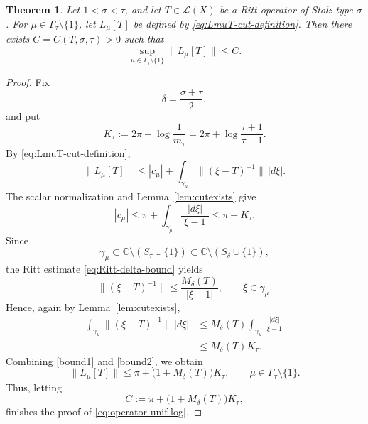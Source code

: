 \documentclass[11pt]{amsart}
\numberwithin{equation}{section}
\newtheorem{theorem}{Theorem}[section]
\theoremstyle{definition}
\theoremstyle{plain}
\def\L{L}
\renewcommand{\L}{\mathcal L}
\begin{document}
\begin{theorem}\label{thm:operator-log-bound}
Let \(1<\sigma<\tau\), and let \(T\in\L(X)\) be a Ritt operator
of Stolz type \(\sigma\).  For \(\mu\in\Gamma_\tau\setminus\{1\}\), let
\(L_\mu[T]\) be defined by \eqref{eq:LmuT-cut-definition}.  
Then there exists
\(C=C(T,\sigma,\tau)>0\) such that 
\begin{equation}\label{eq:operator-unif-log}
        \sup_{\mu\in\Gamma_\tau\setminus\{1\}}
        \|L_\mu[T]\|
        \le C.
\end{equation}
\end{theorem}
\begin{proof}
Fix
\[
        \delta=\frac{\sigma+\tau}{2},
\]
and put
\[
        K_\tau
        :=
        2\pi+\log\frac{1}{m_\tau}
        =
        2\pi+\log\frac{\tau+1}{\tau-1}.
\]
By \eqref{eq:LmuT-cut-definition},
\begin{equation}\label{bound1}
        \|L_\mu[T]\|
        \le
        |c_\mu|
        +
        \int_{\gamma_\mu}\|(\xi-T)^{-1}\|\,|d\xi|.
\end{equation}
The scalar normalization and Lemma~\ref{lem:cutexists} give
\[
        |c_\mu|
        \le
        \pi+
        \int_{\gamma_\mu}\frac{|d\xi|}{|\xi-1|}
        \le
        \pi+K_\tau.
\]
Since
\[
        \gamma_\mu
        \subset
        \mathbb C\setminus(S_\tau\cup\{1\})
        \subset
        \mathbb C\setminus(S_\delta\cup\{1\}),
\]
the Ritt estimate \eqref{eq:Ritt-delta-bound} yields
\[
        \|(\xi-T)^{-1}\|
        \le
        \frac{M_\delta(T)}{|\xi-1|},
        \qquad
        \xi\in\gamma_\mu.
\]
Hence, again by Lemma~\ref{lem:cutexists},
\begin{equation}\label{bound2}
\begin{aligned}
        \int_{\gamma_\mu}\|(\xi-T)^{-1}\|\,|d\xi|
        &\le
        M_\delta(T)
        \int_{\gamma_\mu}\frac{|d\xi|}{|\xi-1|} \\
        &\le
        M_\delta(T)K_\tau.
\end{aligned}
\end{equation}
Combining \eqref{bound1} and \eqref{bound2}, we obtain
\[
        \|L_\mu[T]\|
        \le
        \pi+\bigl(1+M_\delta(T)\bigr)K_\tau,
        \qquad
        \mu\in\Gamma_\tau\setminus\{1\}.
\]
Thus, letting
\[
        C
        :=
        \pi+\bigl(1+M_\delta(T)\bigr)K_\tau,
\]
finishes the proof of \eqref{eq:operator-unif-log}.
\end{proof}
\end{document}
